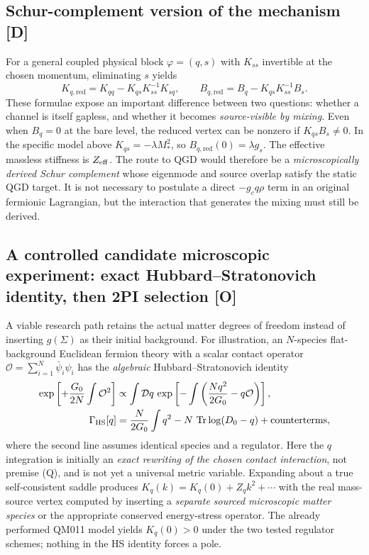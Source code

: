 \documentclass[11pt,a4paper]{article}
\begin{document}
\subsection{Schur-complement version of the mechanism [D]}\label{sec:v09-schur}
For a general coupled physical block $\varphi=(q,s)$ with $K_{ss}$ invertible at the chosen momentum, eliminating $s$ yields
\begin{equation}\label{eq:v09-schur}
K_{q,\mathrm{red}}=K_{qq}-K_{qs}K_{ss}^{-1}K_{sq},\qquad
B_{q,\mathrm{red}}=B_q-K_{qs}K_{ss}^{-1}B_s.
\end{equation}
These formulae expose an important difference between two questions: whether a channel is itself gapless, and whether it becomes \emph{source-visible by mixing}. Even when $B_q=0$ at the bare level, the reduced vertex can be nonzero if $K_{qs}B_s\neq0$. In the specific model above $K_{qs}=-\lambda M_*^2$, so $B_{q,\mathrm{red}}(0)=\lambda g_s$. The effective massless stiffness is $Z_{\rm eff}$. The route to QGD would therefore be a \emph{microscopically derived Schur complement} whose eigenmode and source overlap satisfy the static QGD target. It is not necessary to postulate a direct $-g_c q\rho$ term in an original fermionic Lagrangian, but the interaction that generates the mixing must still be derived.

\subsection{A controlled candidate microscopic experiment: exact Hubbard--Stratonovich identity, then 2PI selection [O]}\label{sec:v09-2pi-test}
A viable research path retains the actual matter degrees of freedom instead of inserting $g(\Sigma)$ as their initial background. For illustration, an $N$-species flat-background Euclidean fermion theory with a scalar contact operator $\mathcal O=\sum_{i=1}^N\bar\psi_i\psi_i$ has the \emph{algebraic} Hubbard--Stratonovich identity
\begin{align}\label{eq:v09-hs-identity}
\exp\left[+\frac{G_0}{2N}\int\mathcal O^2\right]
&\propto\int\mathcal Dq\,\exp\left[-\int\left(\frac{Nq^2}{2G_0}-q\mathcal O\right)\right],\\
\Gamma_{\rm HS}[q]&=\frac{N}{2G_0}\int q^2-N\,\operatorname{Tr}\log(D_0-q)+\text{counterterms},
\end{align}
where the second line assumes identical species and a regulator. Here the $q$ integration is initially an \emph{exact rewriting of the chosen contact interaction}, not premise (Q), and is not yet a universal metric variable. Expanding about a true self-consistent saddle produces $K_q(k)=K_q(0)+Z_qk^2+\cdots$ with the real mass-source vertex computed by inserting a \emph{separate sourced microscopic matter species} or the appropriate conserved energy-stress operator. The already performed QM011 model yields $K_q(0)>0$ under the two tested regulator schemes; nothing in the HS identity forces a pole.
\end{document}
